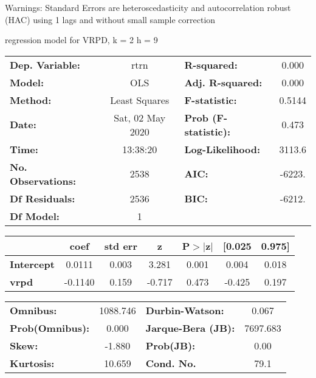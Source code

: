 Warnings: \newline
 [1] Standard Errors are heteroscedasticity and autocorrelation robust (HAC) using 1 lags and without small sample correction\ 

regression model for VRPD, k = 2 h = 9\begin{center}
\begin{tabular}{lclc}
\toprule
\textbf{Dep. Variable:}    &       rtrn       & \textbf{  R-squared:         } &     0.000   \\
\textbf{Model:}            &       OLS        & \textbf{  Adj. R-squared:    } &     0.000   \\
\textbf{Method:}           &  Least Squares   & \textbf{  F-statistic:       } &    0.5144   \\
\textbf{Date:}             & Sat, 02 May 2020 & \textbf{  Prob (F-statistic):} &    0.473    \\
\textbf{Time:}             &     13:38:20     & \textbf{  Log-Likelihood:    } &    3113.6   \\
\textbf{No. Observations:} &        2538      & \textbf{  AIC:               } &    -6223.   \\
\textbf{Df Residuals:}     &        2536      & \textbf{  BIC:               } &    -6212.   \\
\textbf{Df Model:}         &           1      & \textbf{                     } &             \\
\bottomrule
\end{tabular}
\begin{tabular}{lcccccc}
                   & \textbf{coef} & \textbf{std err} & \textbf{z} & \textbf{P$> |$z$|$} & \textbf{[0.025} & \textbf{0.975]}  \\
\midrule
\textbf{Intercept} &       0.0111  &        0.003     &     3.281  &         0.001        &        0.004    &        0.018     \\
\textbf{vrpd}      &      -0.1140  &        0.159     &    -0.717  &         0.473        &       -0.425    &        0.197     \\
\bottomrule
\end{tabular}
\begin{tabular}{lclc}
\textbf{Omnibus:}       & 1088.746 & \textbf{  Durbin-Watson:     } &    0.067  \\
\textbf{Prob(Omnibus):} &   0.000  & \textbf{  Jarque-Bera (JB):  } & 7697.683  \\
\textbf{Skew:}          &  -1.880  & \textbf{  Prob(JB):          } &     0.00  \\
\textbf{Kurtosis:}      &  10.659  & \textbf{  Cond. No.          } &     79.1  \\
\bottomrule
\end{tabular}
\end{center}

